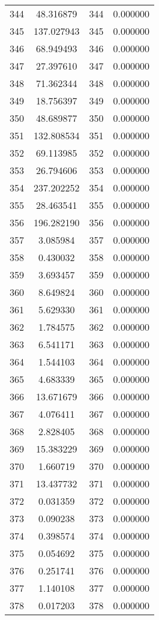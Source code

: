 \documentclass[12pt]{article}
\begin{document}
\begin{longtable}{@{}cccc@{}}
344 & 48.316879 & 344 & 0.000000 \\
345 & 137.027943 & 345 & 0.000000 \\
346 & 68.949493 & 346 & 0.000000 \\
347 & 27.397610 & 347 & 0.000000 \\
348 & 71.362344 & 348 & 0.000000 \\
349 & 18.756397 & 349 & 0.000000 \\
350 & 48.689877 & 350 & 0.000000 \\
351 & 132.808534 & 351 & 0.000000 \\
352 & 69.113985 & 352 & 0.000000 \\
353 & 26.794606 & 353 & 0.000000 \\
354 & 237.202252 & 354 & 0.000000 \\
355 & 28.463541 & 355 & 0.000000 \\
356 & 196.282190 & 356 & 0.000000 \\
357 & 3.085984 & 357 & 0.000000 \\
358 & 0.430032 & 358 & 0.000000 \\
359 & 3.693457 & 359 & 0.000000 \\
360 & 8.649824 & 360 & 0.000000 \\
361 & 5.629330 & 361 & 0.000000 \\
362 & 1.784575 & 362 & 0.000000 \\
363 & 6.541171 & 363 & 0.000000 \\
364 & 1.544103 & 364 & 0.000000 \\
365 & 4.683339 & 365 & 0.000000 \\
366 & 13.671679 & 366 & 0.000000 \\
367 & 4.076411 & 367 & 0.000000 \\
368 & 2.828405 & 368 & 0.000000 \\
369 & 15.383229 & 369 & 0.000000 \\
370 & 1.660719 & 370 & 0.000000 \\
371 & 13.437732 & 371 & 0.000000 \\
372 & 0.031359 & 372 & 0.000000 \\
373 & 0.090238 & 373 & 0.000000 \\
374 & 0.398574 & 374 & 0.000000 \\
375 & 0.054692 & 375 & 0.000000 \\
376 & 0.251741 & 376 & 0.000000 \\
377 & 1.140108 & 377 & 0.000000 \\
378 & 0.017203 & 378 & 0.000000 \\

\end{longtable}
\end{document}
